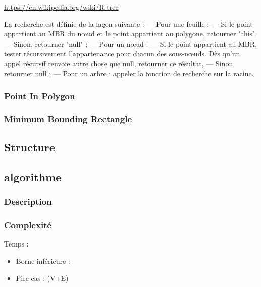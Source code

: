     \href{https://en.wikipedia.org/wiki/R-tree}{https://en.wikipedia.org/wiki/R-tree}


    La recherche est définie de la façon suivante :
    — Pour une feuille :
    — Si le point appartient au MBR du nœud et le point appartient au polygone,
    retourner "this",
    — Sinon, retourner "null" ;
    — Pour un nœud :
    — Si le point appartient au MBR, tester récursivement l’appartenance pour chacun
    des sous-nœuds. Dès qu’un appel récursif renvoie autre chose que null, retourner
    ce résultat,
    — Sinon, retourner null ;
    — Pour un arbre : appeler la fonction de recherche sur la racine.

    \subsubsection{Point In Polygon}
    \subsubsection{Minimum Bounding Rectangle}


    \subsection{Structure}

    \subsection{algorithme}
    \label{sec:}

    \subsubsection{Description}


    \subsubsection{Complexité}
    \label{sec:Complexite}

    Temps :
    \begin{itemize}
        \item Borne inférieure :

        \item Pire cas :
            {(\vert V\vert +\vert E\vert )}

    \end{itemize}



